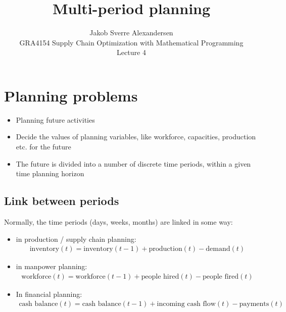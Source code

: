 \documentclass[10pt]{article}
\begin{document}
 
\title{Multi-period planning}
\author{Jakob Sverre Alexandersen\\
GRA4154 Supply Chain Optimization with Mathematical Programming\\
Lecture 4}
\maketitle

\tableofcontents
\newpage

\section{Planning problems}
\begin{itemize}
    \item Planning future activities 
    \item Decide the values of planning variables, like workforce, capacities, production etc. for the future
    \item The future is divided into a number of discrete time periods, within a given time planning horizon
\end{itemize}
\subsection{Link between periods}
Normally, the time periods (days, weeks, months) are linked in some way: 
\begin{itemize}
    \item in production / supply chain planning: 
    \begin{gather*}
        \text{inventory}(t) = \text{inventory}(t - 1) + \text{production}(t) - \text{demand}(t)
    \end{gather*}
    \item in manpower planning: 
    \begin{gather*}
        \text{workforce}(t) = \text{workforce}(t - 1) + \text{people hired}(t) - \text{people fired}(t)
    \end{gather*}
    \item In financial planning: 
    \begin{gather*}
        \text{cash balance}(t) = \text{cash balance}(t - 1) + \text{incoming cash flow}(t) - \text{payments}(t)
    \end{gather*}
\end{itemize}
\newpage
\end{document}
